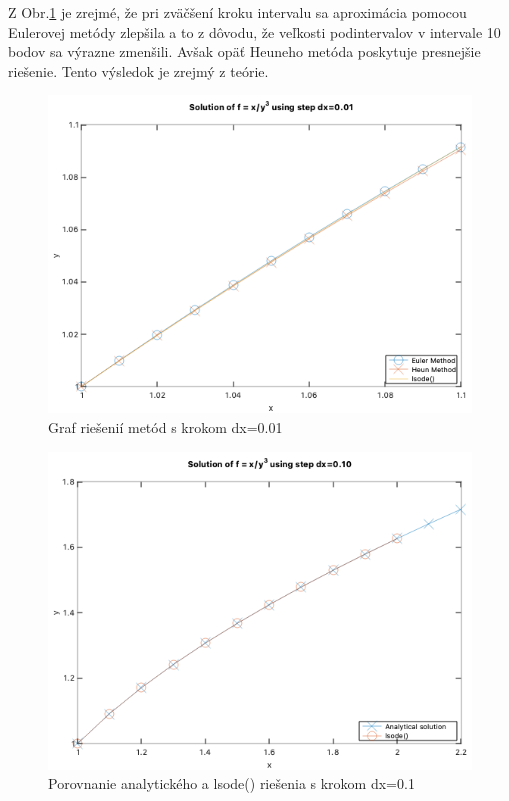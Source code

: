 \documentclass{article}
\theoremstyle{definition}
\theoremstyle{remark}
\begin{document}
Z Obr.\ref{fig:dx001} je zrejmé, že pri zväčšení kroku intervalu sa aproximácia pomocou Eulerovej metódy zlepšila a to z dôvodu, že veľkosti podintervalov v intervale 10 bodov sa výrazne zmenšili. Avšak opäť Heuneho metóda poskytuje presnejšie riešenie. Tento výsledok je zrejmý z teórie.
\begin{figure}[H]
  \centering
  \includegraphics[width=1\textwidth]{hw1_grph5dx001.png}
  \caption{Graf riešenií metód s krokom dx=0.01}
  \label{fig:dx001}
\end{figure}

\begin{figure}[H]
  \centering
  \includegraphics[width=1\textwidth]{hw1_grp3.png}
  \caption{Porovnanie analytického a lsode() riešenia s krokom dx=0.1}
  \label{fig:lsodeexact}
\end{figure}
\end{document}
